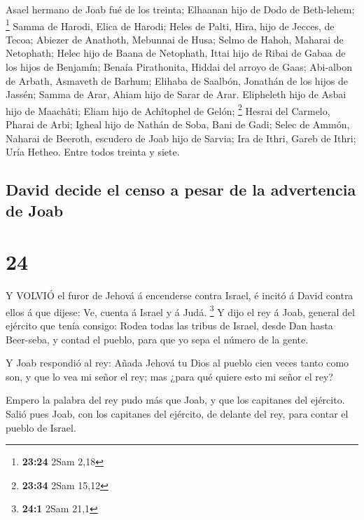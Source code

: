  Asael hermano de Joab fué de los treinta; Elhaanan hijo de
Dodo de Beth-lehem; \footnote{\textbf{23:24} 2Sam 2,18} 
Samma de Harodi, Elica de Harodi;  Heles de Palti, Hira,
hijo de Jecces, de Tecoa;  Abiezer de Anathoth, Mebunnai de
Husa;  Selmo de Hahoh, Maharai de Netophath; 
Helec hijo de Baana de Netophath, Ittai hijo de Ribai de Gabaa de los
hijos de Benjamín;  Benaía Pirathonita, Hiddai del arroyo
de Gaas;  Abi-albon de Arbath, Asmaveth de Barhum;
 Elihaba de Saalbón, Jonathán de los hijos de Jassén;
 Samma de Arar, Ahiam hijo de Sarar de Arar. 
Elipheleth hijo de Asbai hijo de Maachâti; Eliam hijo de Achîtophel de
Gelón; \footnote{\textbf{23:34} 2Sam 15,12}  Hesrai del
Carmelo, Pharai de Arbi;  Igheal hijo de Nathán de Soba,
Bani de Gadi;  Selec de Ammón, Naharai de Beeroth, escudero
de Joab hijo de Sarvia;  Ira de Ithri, Gareb de Ithri;
 Uría Hetheo. Entre todos treinta y siete.

\hypertarget{david-decide-el-censo-a-pesar-de-la-advertencia-de-joab}{%
\subsection{David decide el censo a pesar de la advertencia de
Joab}\label{david-decide-el-censo-a-pesar-de-la-advertencia-de-joab}}

\hypertarget{section-23}{%
\section{24}\label{section-23}}

 Y VOLVIÓ el furor de Jehová á encenderse contra Israel, é
incitó á David contra ellos á que dijese: Ve, cuenta á Israel y á Judá.
\footnote{\textbf{24:1} 2Sam 21,1}  Y dijo el rey á Joab,
general del ejército que tenía consigo: Rodea todas las tribus de
Israel, desde Dan hasta Beer-seba, y contad el pueblo, para que yo sepa
el número de la gente.

 Y Joab respondió al rey: Añada Jehová tu Dios al pueblo
cien veces tanto como son, y que lo vea mi señor el rey; mas ¿para qué
quiere esto mi señor el rey?

 Empero la palabra del rey pudo más que Joab, y que los
capitanes del ejército. Salió pues Joab, con los capitanes del ejército,
de delante del rey, para contar el pueblo de Israel.

